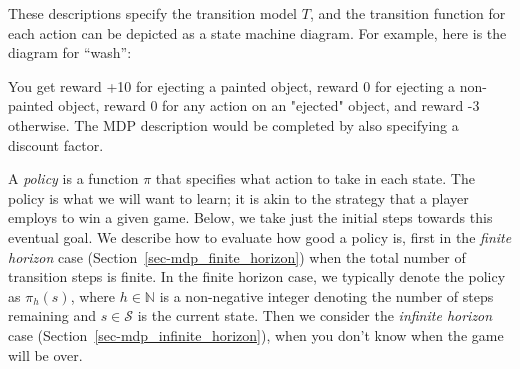 \begin{examplebox}
  \noindent
  These descriptions specify the transition model $T$, and the
  transition function for each action can be depicted as a state machine
  diagram.  For example, here is the diagram for ``wash'':
  \begin{center}
  \end{center}

  You get reward +10 for ejecting a painted object, reward 0 for
  ejecting a non-painted object, reward 0 for any action on an "ejected"
  object, and reward -3 otherwise.  The MDP description would be
  completed by also specifying a discount factor.

\end{examplebox}



A {\it{policy}} is a function $\pi$
that specifies what action to take in each state.  The policy is what
we will want to learn; it is akin to the strategy that a player
employs to win a given game.  Below, we take just the initial steps
towards this eventual goal.  We describe how to evaluate how good a
policy is, first in the {\em finite horizon} case
(Section~\ref{sec-mdp_finite_horizon}) when the total number of
transition steps is finite.  In the finite horizon case, we typically denote
the policy as $\pi_h(s)$, where $h\in\mathbb N$ is a non-negative integer
denoting the number of steps remaining and $s \in \mathcal S$ is the current
state. Then we consider the {\em infinite horizon}
case (Section~\ref{sec-mdp_infinite_horizon}), when you
don't know when the game will be over.

